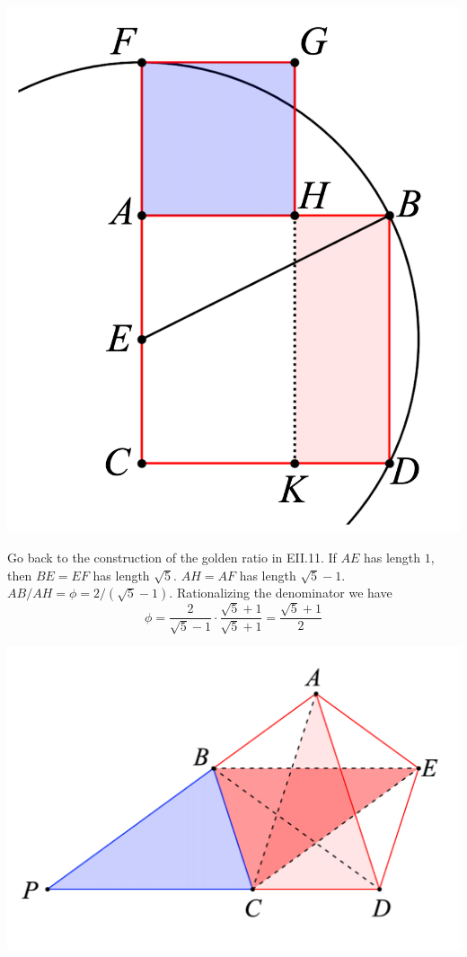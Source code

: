 \documentclass[11pt, oneside]{article}
\begin{document}
\begin{center} \includegraphics [scale=0.3] {EII_11_label.png} \end{center}

Go back to the construction of the golden ratio in EII.11.  If $AE$ has length $1$, then $BE = EF$ has length $\sqrt{5}$.  $AH = AF$ has length $\sqrt{5}-1$.  $AB/AH = \phi = 2/(\sqrt{5}-1)$.  Rationalizing the denominator we have
\[ \phi = \frac{2}{\sqrt{5}-1} \cdot \frac{\sqrt{5}+1}{\sqrt{5}+1} = \frac{\sqrt{5}+1}{2}  \]

\begin{center} \includegraphics [scale=0.3] {easy_pent_label.png} \end{center}
\end{document}

